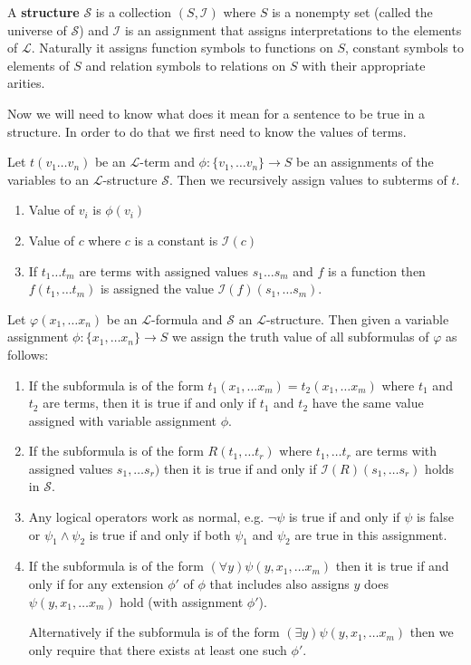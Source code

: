 \begin{defn} A \textbf{structure} $\mathcal{S}$ is a collection $(S,\mathcal{I})$ where $S$ is a nonempty set (called the universe of $\mathcal{S}$) and $\mathcal{I}$ is an assignment that assigns interpretations to the elements of $\mathcal{L}$. Naturally it assigns function symbols to functions on $S$, constant symbols to elements of $S$ and relation symbols to relations on $S$ with their appropriate arities.
\end{defn}

Now we will need to know what does it mean for a sentence to be true in a structure. In order to do that we first need to know the values of terms.

\begin{defn}
Let $t(v_1\dots v_n)$ be an $\mathcal{L}$-term and $\phi:\{v_1,\dots v_n\}\longrightarrow S$ be an assignments of the variables to an $\mathcal{L}$-structure $\mathcal{S}$. Then we recursively assign values to subterms of $t$.
\begin{enumerate}
	\item Value of $v_i$ is $\phi(v_i)$
	\item Value of $c$ where $c$ is a constant is $\mathcal{I}(c)$
	\item If $t_1\dots t_m$ are terms with assigned values $s_1\dots s_m$ and $f$ is a function then $f(t_1,\dots t_m)$ is assigned the value $\mathcal{I}(f)(s_1,\dots s_m)$.
\end{enumerate}
\end{defn}

\begin{defn}
	Let $\varphi(x_1,\dots x_n)$ be an $\mathcal{L}$-formula and $\mathcal{S}$ an $\mathcal{L}$-structure. Then given a variable assignment $\phi:\{x_1,\dots x_n\}\longrightarrow S$ we assign the truth value of all subformulas of $\varphi$ as follows:
\begin{enumerate}
	\item If the subformula is of the form $t_1(x_1,\dots x_m)=t_2(x_1,\dots x_m)$ where $t_1$ and $t_2$ are terms, then it is true if and only if $t_1$ and $t_2$ have the same value assigned with variable assignment $\phi$.
	\item If the subformula is of the form $R(t_1, \dots t_r)$ where $t_1, \dots t_r$ are terms with assigned values $s_1, \dots s_r)$ then it is true if and only if $\mathcal{I}(R)(s_1,\dots s_r)$ holds in $\mathcal{S}$.
	\item Any logical operators work as normal, e.g. $\neg \psi$ is true if and only if $\psi$ is false or $\psi_1 \wedge \psi_2$ is true if and only if both $\psi_1$ and $\psi_2$ are true in this assignment. 
	\item If the subformula is of the form $(\forall y) \psi(y,x_1,\dots x_m)$ then it is true if and only if for any extension $\phi'$ of $\phi$ that includes also assigns $y$ does $\psi(y,x_1,\dots x_m)$ hold (with assignment $\phi'$).
	
	Alternatively if the subformula is of the form $(\exists y)\psi(y,x_1,\dots x_m)$ then we only require that there exists at least one such $\phi'$.
\end{enumerate}
\end{defn}

